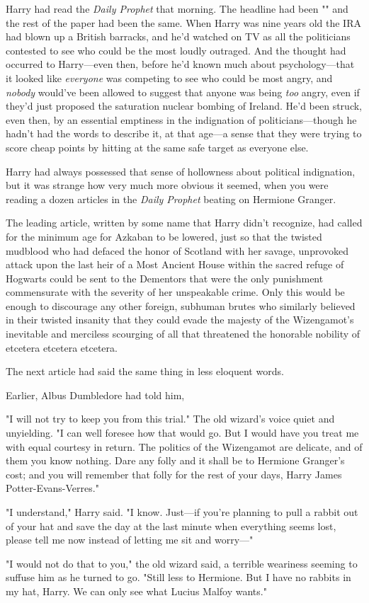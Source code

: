 Harry had read the \emph{Daily Prophet} that morning. The headline had been
"" and the rest of the paper had been
the same. When Harry was nine years old the IRA had blown up a British
barracks, and he'd watched on TV as all the politicians contested to see who
could be the most loudly outraged. And the thought had occurred to Harry---even
then, before he'd known much about psychology---that it looked like
\emph{everyone} was competing to see who could be most angry, and \emph{nobody}
would've been allowed to suggest that anyone was being \emph{too} angry, even
if they'd just proposed the saturation nuclear bombing of Ireland. He'd been
struck, even then, by an essential emptiness in the indignation of
politicians---though he hadn't had the words to describe it, at that age---a
sense that they were trying to score cheap points by hitting at the same safe
target as everyone else.

Harry had always possessed that sense of hollowness about political
indignation, but it was strange how very much more obvious it seemed, when you
were reading a dozen articles in the \emph{Daily Prophet} beating on Hermione
Granger.

The leading article, written by some name that Harry didn't recognize, had
called for the minimum age for Azkaban to be lowered, just so that the twisted
mudblood who had defaced the honor of Scotland with her savage, unprovoked
attack upon the last heir of a Most Ancient House within the sacred refuge of
Hogwarts could be sent to the Dementors that were the only punishment
commensurate with the severity of her unspeakable crime. Only this would be
enough to discourage any other foreign, subhuman brutes who similarly believed
in their twisted insanity that they could evade the majesty of the Wizengamot's
inevitable and merciless scourging of all that threatened the honorable
nobility of etcetera etcetera etcetera.

The next article had said the same thing in less eloquent words.

Earlier, Albus Dumbledore had told him,

\begin{em}
"I will not try to keep you from this trial." The old wizard's voice
quiet and unyielding. "I can well foresee how that would go. But I would have
you treat me with equal courtesy in return. The politics of the Wizengamot are
delicate, and of them you know nothing. Dare any folly and it shall be to
Hermione Granger's cost; and you will remember that folly for the rest of your
days, Harry James Potter-Evans-Verres."

"I understand," Harry said. "I know. Just---if you're planning to pull a
rabbit out of your hat and save the day at the last minute when everything
seems lost, please tell me now instead of letting me sit and worry---"

"I would not do that to you," the old wizard said, a terrible weariness
seeming to suffuse him as he turned to go. "Still less to Hermione. But I have
no rabbits in my hat, Harry. We can only see what Lucius Malfoy wants."
\end{em}

